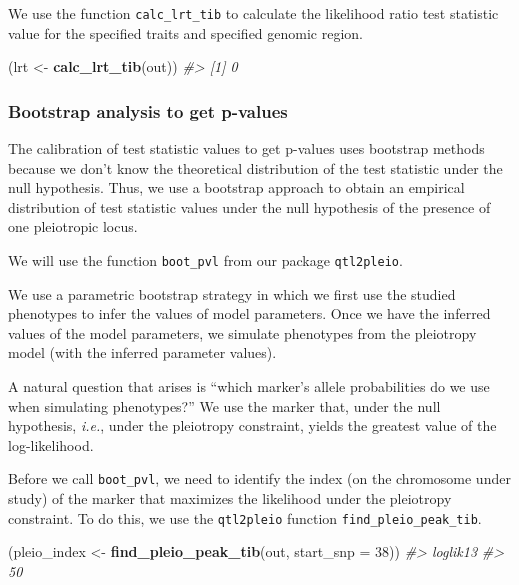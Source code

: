 \documentclass[oneside]{book}\usepackage[]{graphicx}\usepackage[]{color}
\newenvironment{Shaded}{\begin{snugshade}}{\end{snugshade}}
\newcommand{\CommentTok}[1]{\textcolor[rgb]{0.56,0.35,0.01}{\textit{#1}}}
\newcommand{\DataTypeTok}[1]{\textcolor[rgb]{0.13,0.29,0.53}{#1}}
\newcommand{\DecValTok}[1]{\textcolor[rgb]{0.00,0.00,0.81}{#1}}
\newcommand{\KeywordTok}[1]{\textcolor[rgb]{0.13,0.29,0.53}{\textbf{#1}}}
\newcommand{\NormalTok}[1]{#1}
\newcommand{\StringTok}[1]{\textcolor[rgb]{0.31,0.60,0.02}{#1}}
\begin{document}
We use the function \texttt{calc\_lrt\_tib} to calculate the likelihood
ratio test statistic value for the specified traits and specified
genomic region.

\begin{Shaded}
\begin{Highlighting}[]
\NormalTok{(lrt <-}\StringTok{ }\KeywordTok{calc_lrt_tib}\NormalTok{(out))}
\CommentTok{#> [1] 0}
\end{Highlighting}
\end{Shaded}

\hypertarget{bootstrap-analysis-to-get-p-values}{%
\subsubsection{Bootstrap analysis to get
p-values}\label{bootstrap-analysis-to-get-p-values}}

The calibration of test statistic values to get p-values uses bootstrap
methods because we don't know the theoretical distribution of the test
statistic under the null hypothesis. Thus, we use a bootstrap approach
to obtain an empirical distribution of test statistic values under the
null hypothesis of the presence of one pleiotropic locus.

We will use the function \texttt{boot\_pvl} from our package
\texttt{qtl2pleio}.

We use a parametric bootstrap strategy in which we first use the studied
phenotypes to infer the values of model parameters. Once we have the
inferred values of the model parameters, we simulate phenotypes from the
pleiotropy model (with the inferred parameter values).

A natural question that arises is ``which marker's allele probabilities
do we use when simulating phenotypes?'' We use the marker that, under
the null hypothesis, \emph{i.e.}, under the pleiotropy constraint,
yields the greatest value of the log-likelihood.

Before we call \texttt{boot\_pvl}, we need to identify the index (on the
chromosome under study) of the marker that maximizes the likelihood
under the pleiotropy constraint. To do this, we use the
\texttt{qtl2pleio} function \texttt{find\_pleio\_peak\_tib}.

\begin{Shaded}
\begin{Highlighting}[]
\NormalTok{(pleio_index <-}\StringTok{ }\KeywordTok{find_pleio_peak_tib}\NormalTok{(out, }\DataTypeTok{start_snp =} \DecValTok{38}\NormalTok{))}
\CommentTok{#> loglik13 }
\CommentTok{#>       50}
\end{Highlighting}
\end{Shaded}
\end{document}
